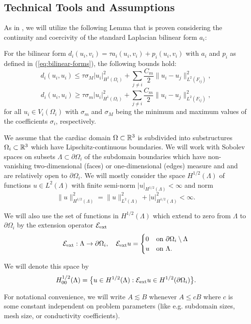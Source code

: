\subsection{Technical Tools and Assumptions}
As in \cite{2D-proof}, we will utilize the following Lemma that is proven considering the continuity and coercivity of the standard Laplacian bilinear form $a_i$:
\begin{lemma}
    For the bilinear form $d_i(u_i, v_i) = \tau a_i(u_i, v_i) + p_i(u_i, v_i)$ with $a_i$ and $p_i$ as defined in (\ref{eq:bilinear-forms}), the following bounds hold:
    \[d_i(u_i, u_i) \leq \tau \sigma_M |u_i|^2_{H^1(\Omega_i)} + \sum_{j \neq i} \frac{C_m}{2}\|u_i - u_j\|^2_{L^2(F_{ij})},\]
    \[d_i(u_i, u_i) \geq \tau \sigma_m|u_i|^2_{H^1(\Omega_i)} + \sum_{j \neq i} \frac{C_m}{2}\|u_i - u_j\|^2_{L^2(F_{ij})},\]
    for all $u_i \in V_i(\Omega_i)$ with $\sigma_m$ and $\sigma_M$ being the minimum and maximum values of the coefficients $\sigma_i$, respectively.
\end{lemma}

We assume that the cardiac domain $\Omega \subset \mathbb{R}^3$ is subdivided into substructures $\Omega_i \subset \mathbb{R}^3$ which have Lipschitz-continuous boundaries. We will work with Sobolev spaces on subsets $\Lambda \subset \partial \Omega_i$ of the subdomain boundaries which have non-vanishing two-dimensional (faces) or one-dimensional (edges) measure and and are relatively open to $\partial \Omega_i$. We will mostly consider the space $H^{1/2}(\Lambda)$ of functions $u \in L^2(\Lambda)$ with finite semi-norm $|u|_{H^{1/2}(\Lambda)} < \infty$ and norm 
\[\|u\|^2_{H^{1/2}(\Lambda)} = \|u\|^2_{L^2(\Lambda)} + |u|^2_{H^{1/2}(\Lambda)} < \infty.\]

We will also use the set of functions in $H^{1/2}(\Lambda)$ which extend to zero from $\Lambda$ to $\partial \Omega_i$ by the extension operator $\mathcal{E}_{\text{ext}}$
\[\mathcal{E}_{\text{ext}}: \Lambda \rightarrow \partial \Omega_i,\quad \mathcal{E}_{\text{ext}}u = \begin{cases}
    0 & \text{on } \partial\Omega_i \setminus \Lambda \\
    u & \text{on } \Lambda.
\end{cases}\]

We will denote this space by
\[H^{1/2}_{00}(\Lambda) = \big\{ u \in H^{1/2}(\Lambda): \mathcal{E}_{\text{ext}}u \in H^{1/2}(\partial\Omega_i)\big\}.\]

\begin{remark}
    For notational convenience, we will write $A \lesssim B$ whenever $A \leq cB$ where $c$ is some constant independent on problem parameters (like e.g. subdomain sizes, mesh size, or conductivity coefficients).
\end{remark}

